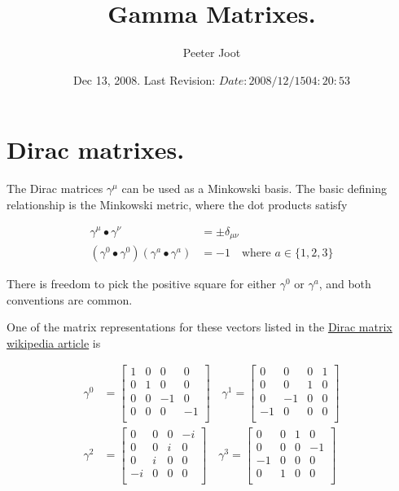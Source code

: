 \documentclass{article}
\title{ Gamma Matrixes. }
\author{Peeter Joot}
\date{ Dec 13, 2008.  Last Revision: $Date: 2008/12/15 04:20:53 $ }
\newcommand{\scalarProduct}[2]{{#1} \bullet {#2}}
\begin{document}
\maketitle{}


\section{ Dirac matrixes. }

The Dirac matrices $\gamma^\mu$ can be used as a Minkowski basis.  The basic defining relationship is the Minkowski metric, where the dot products satisfy

\begin{align*}
\scalarProduct{\gamma^\mu}{\gamma^\nu} &= \pm \delta_{\mu\nu} \\
(\scalarProduct{\gamma^0}{\gamma^0})(\scalarProduct{\gamma^a}{\gamma^a}) &= -1 \quad \text{where $a \in \{1,2,3\}$}
\end{align*}

There is freedom to pick the positive square for either $\gamma^0$ or $\gamma^a$, and both conventions are common.

One of the matrix representations for these vectors listed in the 
\href{http://en.wikipedia.org/wiki/Gamma_matrices}{Dirac matrix wikipedia article}
is

\begin{align}\label{eqn:basis}
\gamma^0 &= \begin{bmatrix}
 1  &  0  &  0  &  0  \\
 0  &  1  &  0  &  0  \\
 0  &  0  &  -1  &  0  \\
 0  &  0  &  0  &  -1  \\
\end{bmatrix} \quad
\gamma^1 = \begin{bmatrix}
 0  &  0  &  0  &  1  \\
 0  &  0  &  1  &  0  \\
 0  &  -1  &  0  &  0  \\
 -1  &  0  &  0  &  0  \\
\end{bmatrix} \\
\gamma^2 &= \begin{bmatrix}
 0  &  0  &  0  &  -i  \\
 0  &  0  &  i  &  0  \\
 0  &  i  &  0  &  0  \\
 -i  &  0  &  0  &  0  \\
\end{bmatrix}
\quad \gamma^3 = \begin{bmatrix}
 0  &  0  &  1  &  0  \\
 0  &  0  &  0  &  -1  \\
 -1  &  0  &  0  &  0  \\
 0  &  1  &  0  &  0  \\
\end{bmatrix}
\end{align}
\end{document}
